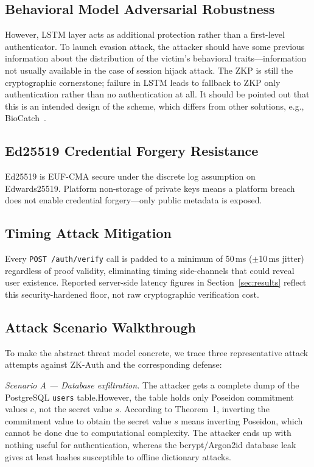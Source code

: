 \documentclass[journal,twoside,10pt]{IEEEtran}
\begin{document}
\subsection{Behavioral Model Adversarial Robustness}
However, LSTM layer acts as additional protection rather than a first-level authenticator. To launch evasion attack, the attacker should have some previous information about the distribution of the victim's behavioral traits---information not usually available in the case of session hijack attack. The ZKP is still the cryptographic cornerstone; failure in LSTM leads to fallback to ZKP only authentication rather than no authentication at all. It should be pointed out that this is an intended design of the scheme, which differs from other solutions, e.g., BioCatch~\cite{biocatch}.

\subsection{Ed25519 Credential Forgery Resistance}
Ed25519 is EUF-CMA secure under the discrete log assumption on Edwards25519.
Platform non-storage of private keys means a platform breach does not
enable credential forgery---only public metadata is exposed.

\subsection{Timing Attack Mitigation}
Every \texttt{POST /auth/verify} call is padded to a minimum of 50\,ms
($\pm$10\,ms jitter) regardless of proof validity, eliminating timing
side-channels that could reveal user existence. Reported server-side latency
figures in Section~\ref{sec:results} reflect this security-hardened floor,
not raw cryptographic verification cost.

\subsection{Attack Scenario Walkthrough}

To make the abstract threat model concrete, we trace three representative
attack attempts against ZK-Auth and the corresponding defense:

\textit{Scenario A --- Database exfiltration.} The attacker gets a complete dump of the PostgreSQL \texttt{users} table.However, the table holds only Poseidon commitment values $c$, not the secret
value $s$. According to Theorem~1, inverting the commitment value to obtain
the secret value $s$ means inverting Poseidon, which cannot be done due to
computational complexity. The attacker ends up with nothing useful for
authentication, whereas the bcrypt/Argon2id database leak gives at least
hashes susceptible to offline dictionary attacks.
\end{document}
